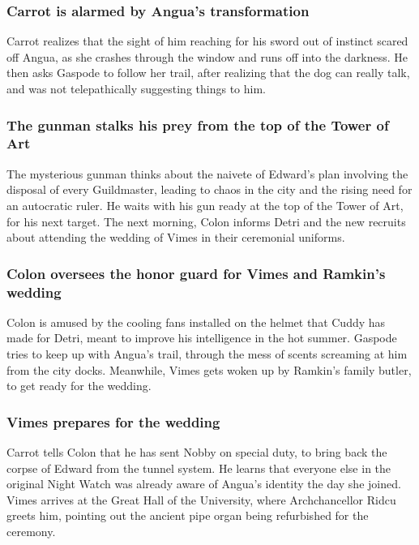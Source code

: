\subsubsection{\Gls{Carrot} is alarmed by \Gls{Angua}'s transformation}
\Gls{Carrot} realizes that the sight of him reaching for his sword out of instinct scared off
\Gls{Angua}, as she crashes through the window and runs off into the darkness. He then asks
\Gls{Gaspode} to follow her trail, after realizing that the dog can really talk, and was not
telepathically suggesting things to him.

\subsubsection{The gunman stalks his prey from the top of the Tower of Art}
The mysterious gunman thinks about the naivete of \Gls{Edward}'s plan involving the disposal of
every Guildmaster, leading to chaos in the city and the rising need for an autocratic ruler. He
waits with his gun ready at the top of the Tower of Art, for his next target. The next morning,
\Gls{Colon} informs \Gls{Detri} and the new recruits about attending the wedding of \Gls{Vimes} in
their ceremonial uniforms.

\subsubsection{\Gls{Colon} oversees the honor guard for \Gls{Vimes} and \Gls{Ramkin}'s wedding}
\Gls{Colon} is amused by the cooling fans installed on the helmet that \Gls{Cuddy} has made for
\Gls{Detri}, meant to improve his intelligence in the hot summer. \Gls{Gaspode} tries to keep up
with \Gls{Angua}'s trail, through the mess of scents screaming at him from the city docks.
Meanwhile, \Gls{Vimes} gets woken up by \Gls{Ramkin}'s family butler, to get ready for the wedding.

\subsubsection{\Gls{Vimes} prepares for the wedding}
\Gls{Carrot} tells \Gls{Colon} that he has sent \Gls{Nobby} on special duty, to bring back the
corpse of \Gls{Edward} from the tunnel system. He learns that everyone else in the original Night
Watch was already aware of \Gls{Angua}'s identity the day she joined. \Gls{Vimes} arrives at the
Great Hall of the University, where Archchancellor \Gls{Ridcu} greets him, pointing out the ancient
pipe organ being refurbished for the ceremony.

